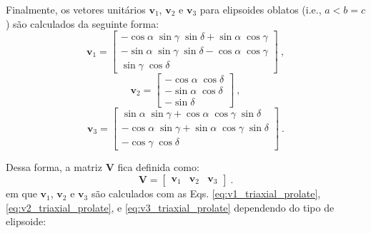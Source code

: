 Finalmente, os vetores unitários $\mathbf{v}_{1}$, $\mathbf{v}_{2}$ e $\mathbf{v}_{3}$ para elipsoides oblatos (i.e., $a < b = c$) são calculados da seguinte forma:
\begin{equation}
\mathbf{v}_{1} = \left[\begin{array}{c} 
-\cos\alpha \; \sin\gamma \; \sin\delta + \sin\alpha \; \cos\gamma \\               
-\sin\alpha \; \sin\gamma \; \sin\delta - \cos\alpha \; \cos\gamma \\ 
\sin\gamma \; \cos\delta
\end{array} \right] \: ,
\label{eq:v1_oblate}
\end{equation}
\begin{equation}
\mathbf{v}_{2} = \left[\begin{array}{c} 
-\cos\alpha \; \cos\delta \\
-\sin\alpha \; \cos\delta \\
-\sin\delta
\end{array} \right] \: ,
\label{eq:v2_oblate}
\end{equation}                   
\begin{equation}                    
\mathbf{v}_{3} = \left[\begin{array}{c} 
\sin\alpha \; \sin\gamma + \cos\alpha \; \cos\gamma \; \sin\delta \\                    
-\cos\alpha \; \sin\gamma + \sin\alpha \; \cos\gamma \; \sin\delta \\
-\cos\gamma \; \cos\delta
\end{array} \right] \: .
\label{eq:v3_oblate}
\end{equation}

Dessa forma, a matriz $\mathbf{V}$ fica definida como:
\begin{equation}
\mathbf{V} = \left[ \begin{array}{ccc}
\mathbf{v}_{1} & \mathbf{v}_{2} & \mathbf{v}_{3}
\end{array} \right] \: .
\label{eq:V_triaxial_prolate}
\end{equation}
em que $\mathbf{v}_{1}$, $\mathbf{v}_{2}$ e $\mathbf{v}_{3}$ são calculados com as Eqs.
\ref{eq:v1_triaxial_prolate}, \ref{eq:v2_triaxial_prolate}, e \ref{eq:v3_triaxial_prolate} dependendo do tipo de elipsoide:

